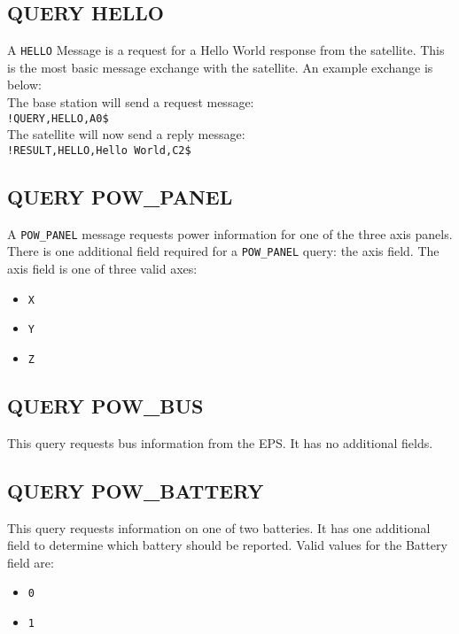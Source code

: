 \documentclass{article}
\begin{document}
  \subsection{QUERY HELLO}
    A \mquery \texttt{HELLO} Message is a \mquery request for a Hello World response from the satellite. This is the most basic
    message exchange with the satellite. An example exchange is below: \\[5pt]
    The base station will send a request \mquery message: \\[5pt]
    \texttt{!QUERY,HELLO,A0\$} \\[5pt]
    The satellite will now send a reply \mresult message: \\[5pt]
    \texttt{!RESULT,HELLO,Hello World,C2\$} \\[5pt]
    
    
  \subsection{QUERY POW\_PANEL}
    A \mquery \texttt{POW\_PANEL} message requests power information for one of the three axis panels. There is one additional
    field required for a \mquery \texttt{POW\_PANEL} query: the axis field. The axis field is one of three valid axes:
    \begin{itemize}
    \item \texttt{X}
    \item \texttt{Y}
    \item \texttt{Z}
    \end{itemize}
    
  \subsection{QUERY POW\_BUS}
    This query requests bus information from the EPS. It has no additional fields.
    
  \subsection{QUERY POW\_BATTERY}
    This query requests information on one of two batteries. It has one additional field to determine which battery should be reported.
    Valid values for the Battery field are: 
    \begin{itemize}
    \item \texttt{0}
    \item \texttt{1}
    \end{itemize}
    
\end{document}
